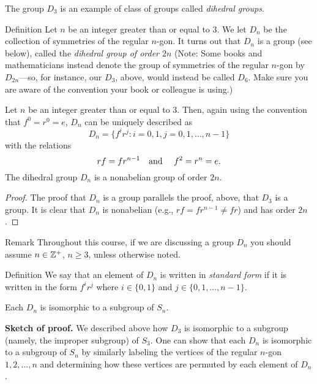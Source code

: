 The group $D_3$ is an example of class of groups called \textit{dihedral groups}.


\begin{df}{Definition} Let $n$ be an integer greater than or equal to $3$. We
let $D_n$ be the collection of symmetries of the regular
$n$-gon. It turns out that $D_n$ is a group (see below), called
the \textit{dihedral group of order $2n$} (Note: Some books and
mathematicians instead denote the group of symmetries of the
regular $n$-gon by $D_{2n}$---so, for instance, our $D_3$,
above, would instead be called $D_6$.  Make sure you are aware
of the convention your book or colleague is using.)\end{df}


\begin{thm}\label{rf} Let $n$ be an integer greater than or equal to $3$.  Then, again using the convention that $f^0=r^0=e$, $D_n$ can be uniquely described as
$$D_n=\{f^ir^j: i=0,1, j=0,1,\ldots, n-1\}$$ with the relations $$rf=fr^{n-1} \mbox{\quad and \quad} f^2=r^n=e.$$ The dihedral group $D_n$ is a nonabelian group of order $2n$.
\end{thm}

\begin{proof} The proof that $D_n$ is a group parallels the proof, above, that $D_3$ is a group.  It is clear that $D_n$ is nonabelian (e.g., $rf=fr^{n-1}\neq fr$) and has order $2n$.\end{proof}

\begin{df}{Remark} Throughout this course, if we are discussing a
group $D_n$ you should assume $n\in \mathbb{Z}^+$, $n\geq 3$, unless
otherwise noted.\end{df}

\begin{df}{Definition} We say that an element of $D_n$ is written in \textit{standard form} if it is written in the form $f^ir^j$ where
$i\in \{0,1\}$ and $j\in \{0,1,\ldots,n-1\}$.\end{df}

\begin{thm} Each $D_n$ is isomorphic to a subgroup of $S_n$.
\end{thm}

\noindent
\textbf{Sketch of proof.} We described above how $D_3$ is isomorphic to a subgroup
(namely, the improper subgroup) of $S_3$.  One can show that each $D_n$ is isomorphic to a subgroup of $S_n$ by similarly labeling the vertices of the regular $n$-gon $1,2,\ldots, n$ and determining how these vertices are permuted by each element of $D_n$.

